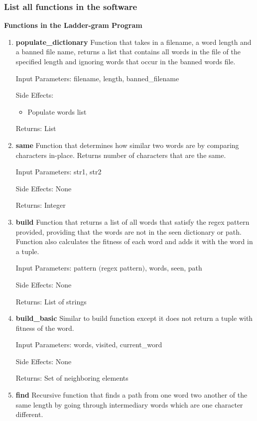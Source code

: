 \documentclass[12pt, a4]{report}
\begin{document}
	\subsubsection{List all functions in the software}
	\textbf{	Functions in the Ladder-gram Program}
	\begin{enumerate}
		\item
			\textbf{populate\_dictionary}
			\textbar{}  Function that takes in a filename, a word length and a banned file name, returns a list that contains all words in the file of the specified length and ignoring words that occur in the banned words file.
			\par Input Parameters: filename, length, banned\_filename 
			\par Side Effects:
			\begin{itemize}
				\item Populate words list
			\end{itemize}
			\par Returns: List
		\item
			\textbf{same}
			\textbar{}  Function that determines how similar two words are by comparing characters in-place. Returns number of characters that are the same.
			\par Input Parameters: str1, str2
			\par Side Effects: None
			\par Returns: Integer
		\item
			\textbf{build}
			\textbar{}  Function that returns a list of all words that satisfy the regex pattern provided, providing that the words are not in the seen dictionary or path. 
			    Function also calculates the fitness of each word and adds it with the word in a tuple.
			\par Input Parameters: pattern $($regex pattern$)$, words, seen, path
			\par Side Effects: None
			\par Returns: List of strings
		\item 
			\textbf{build\_basic}
			\textbar{} Similar to build function except it does not return a tuple with fitness of the word.  
			\par Input Parameters: words, visited, current\_word 
			\par Side Effects: None 
			\par Returns: Set of neighboring elements 
		\item
			\textbf{find}
			\textbar{}  Recursive function that finds a path from one word two another of the same length by going through intermediary words which are one character different.

\end{enumerate}
\end{document}

